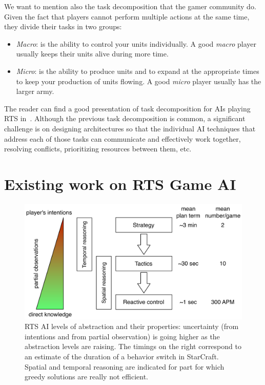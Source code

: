 \documentclass[journal]{IEEEtran}
\begin{document}
We want to mention also the task decomposition that the gamer community do. Given the fact that players cannot perform multiple actions at the same time, they divide their tasks in two groups:
\begin{itemize}
  \item {\em Macro}: is the ability to control your units individually. A good \emph{macro} player usually keeps their units alive during more time.
  \item {\em Micro}: is the ability to produce units and to expand at the appropriate times to keep your production of units flowing. A good \emph{micro} player usually has the larger army.
\end{itemize}

The reader can find a  good presentation of task decomposition for AIs
playing RTS in~\cite{weber2011acs}. Although the previous task decomposition is common, a significant challenge is on designing architectures so that the individual AI techniques that address each of those tasks can communicate and effectively work together, resolving conflicts, prioritizing resources between them, etc.


\section{Existing work on RTS Game AI}\label{sec:review}

\begin{figure}
    \centering
    \includegraphics[width=0.9\columnwidth]{figures/levels_abstraction.pdf}
    \caption{RTS AI levels of abstraction and their properties: uncertainty (from intentions and from partial observation) is going higher as the abstraction levels are raising. The timings on the right correspond to an estimate of the duration of a behavior switch in StarCraft. Spatial and temporal reasoning are indicated for part for which greedy solutions are really not efficient.}
    \label{fig:levels-abstraction}
\end{figure}
\end{document}
